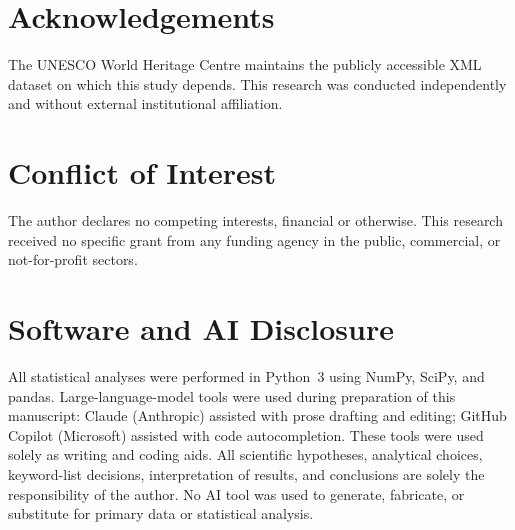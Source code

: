 \section*{Acknowledgements}
The UNESCO World Heritage Centre maintains the publicly accessible XML
dataset on which this study depends. This research was conducted independently and without external institutional affiliation.

\section*{Conflict of Interest}
The author declares no competing interests, financial or otherwise.
This research received no specific grant from any funding agency in the
public, commercial, or not-for-profit sectors.

\section*{Software and AI Disclosure}
All statistical analyses were performed in Python~3 using NumPy, SciPy, and pandas.
Large-language-model tools were used during preparation of this manuscript:
Claude (Anthropic) assisted with prose drafting and editing;
GitHub Copilot (Microsoft) assisted with code autocompletion.
These tools were used solely as writing and coding aids.
All scientific hypotheses, analytical choices, keyword-list decisions,
interpretation of results, and conclusions are solely the responsibility of the author.
No AI tool was used to generate, fabricate, or substitute for primary data or statistical analysis.
